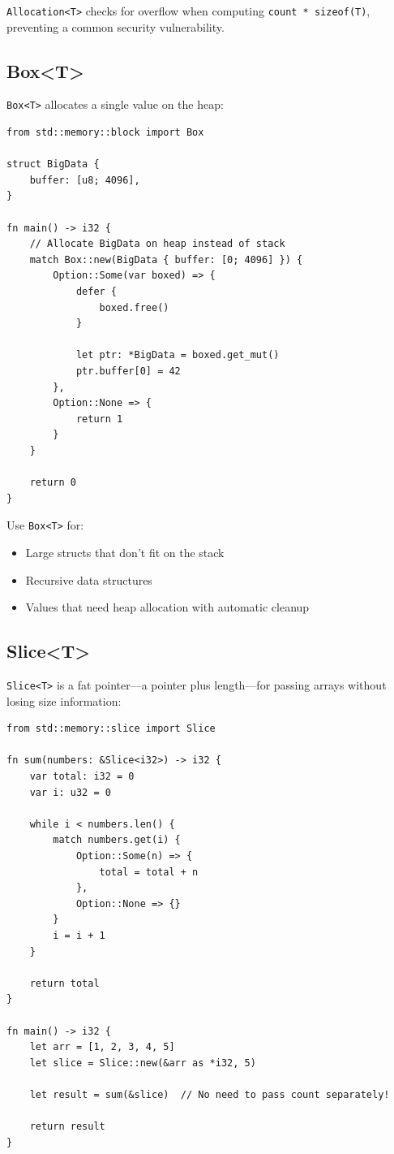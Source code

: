 \texttt{Allocation<T>} checks for overflow when computing \texttt{count * sizeof(T)}, preventing a common security vulnerability.

\subsection{Box<T>}

\texttt{Box<T>} allocates a single value on the heap:

\begin{lstlisting}
from std::memory::block import Box

struct BigData {
    buffer: [u8; 4096],
}

fn main() -> i32 {
    // Allocate BigData on heap instead of stack
    match Box::new(BigData { buffer: [0; 4096] }) {
        Option::Some(var boxed) => {
            defer {
                boxed.free()
            }

            let ptr: *BigData = boxed.get_mut()
            ptr.buffer[0] = 42
        },
        Option::None => {
            return 1
        }
    }

    return 0
}
\end{lstlisting}

Use \texttt{Box<T>} for:
\begin{itemize}
    \item Large structs that don't fit on the stack
    \item Recursive data structures
    \item Values that need heap allocation with automatic cleanup
\end{itemize}

\subsection{Slice<T>}

\texttt{Slice<T>} is a fat pointer---a pointer plus length---for passing arrays without losing size information:

\begin{lstlisting}
from std::memory::slice import Slice

fn sum(numbers: &Slice<i32>) -> i32 {
    var total: i32 = 0
    var i: u32 = 0

    while i < numbers.len() {
        match numbers.get(i) {
            Option::Some(n) => {
                total = total + n
            },
            Option::None => {}
        }
        i = i + 1
    }

    return total
}

fn main() -> i32 {
    let arr = [1, 2, 3, 4, 5]
    let slice = Slice::new(&arr as *i32, 5)

    let result = sum(&slice)  // No need to pass count separately!

    return result
}
\end{lstlisting}

